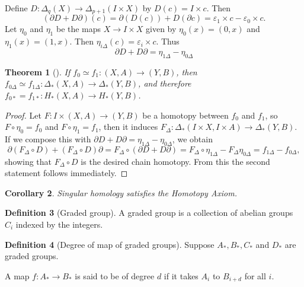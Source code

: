 \documentclass[reqno]{amsart}
\newtheorem{theorem}{Theorem}[section]
\newtheorem{corollary}[theorem]{Corollary}
\theoremstyle{definition}
\newtheorem{definition}[theorem]{Definition}
\theoremstyle{remark}
\begin{document}
Define $D \colon 
\Delta_q (X) \to \Delta_{p+1}(I \times X)$ by
$D(c) = I \times c$. Then
\[
    \left( \partial D + D \partial \right) (c)
    = \partial \left( D (c) \right) +
    D\left( \partial c \right) = 
    \varepsilon_1 \times c- \varepsilon_0 \times c.
\] 
Let $\eta_0$ and $\eta_1$ be the maps
$X \to I \times X$ given by
$\eta_0 (x) = (0,x)$ and $\eta_1 (x) = (1,x)$.
Then $\eta_{i \Delta}(c) = \varepsilon_i \times c$.
Thus
\[
\partial D + D \partial = 
\eta_{1 \Delta} - \eta_{0 \Delta}
\] 


\begin{theorem}[]
    If $f_0 \simeq f_1 \colon (X,A) \to (Y,B)$, then
    $f_{0 \Delta} \simeq f_{1 \Delta} \colon
    \Delta_* (X,A) \to \Delta_* (Y,B)$, and therefore
    $f_{0*} = f_{1*} \colon
    H_*(X,A) \to H_*(Y,B)$.
\end{theorem}

\begin{proof}
    Let $F \colon I \times (X,A) \to (Y,B)$ be a homotopy
    between $f_0$ and $f_1$, so $F \circ \eta_0 = f_0$ and
    $F \circ \eta_1 = f_1$, then 
    it induces
    $F_{\Delta} \colon \Delta_* \left( I \times X,
    I \times A\right) \to \Delta_*(Y,B)$. If we compose
    this with $\partial D + D \partial = 
    \eta_{1 \Delta} - \eta_{0 \Delta}$, we obtain
    \[
    \partial \left( F_{\Delta}\circ D \right) +
    \left( F_{\Delta}\circ D \right) \partial =
    F_{\Delta} \circ \left( \partial D + D \partial \right) 
    = F_{\Delta} \circ \eta_{1 \Delta} - 
    F_{\Delta} \eta_{0 \Delta}=
    f_{1 \Delta} - f_{0 \Delta},
    \] 
    showing that
    $F_{\Delta}\circ D$ is the desired chain homotopy.
    From this the second statement follows immediately.
\end{proof}

\begin{corollary}
    Singular homology satisfies the Homotopy Axiom.
\end{corollary}
















\begin{definition}[Graded group]
    A graded group is a collection of abelian groups
    $C_i$ indexed by the integers.
\end{definition}


\begin{definition}[Degree of map of graded groups]
Suppose $A_*, B_*, C_*$ and $D_*$ are graded groups.

A map $f \colon A_* \to B_*$ is said to be of degree
$d$ if it takes $A_i$ to $B_{i+d}$ for all $i$.
\end{definition}
\end{document}
